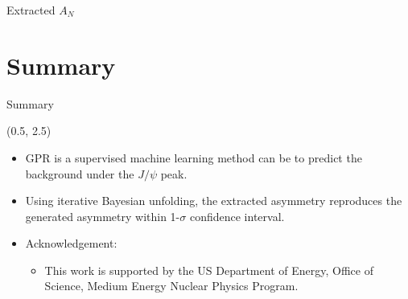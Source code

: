 \documentclass[10pt, xcolor={dvipsnames}, aspectratio = 169]{beamer}
\newcommand{\jpsi}{$J/\psi$ }
\begin{document}
\begin{frame}{Extracted $A_{N}$}
\end{frame}

%
%
\section{Summary}

\begin{frame}{Summary}

\begin{textblock}{15.0}(0.5, 2.5)

\begin{itemize}

\item GPR is a supervised machine learning method can be to predict the background under the \jpsi peak.

\item Using iterative Bayesian unfolding, the extracted asymmetry reproduces the generated asymmetry within 1-$\sigma$ confidence interval.

\item Acknowledgement:

\begin{itemize}
    \item This work is supported by the US Department of Energy, Office of Science, Medium Energy Nuclear Physics Program.
\end{itemize}

\end{itemize}

\end{textblock}

\end{frame}
\end{document}

